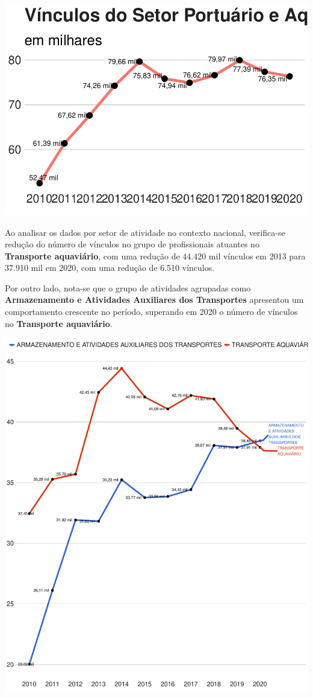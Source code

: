 \documentclass[
]{article}
\begin{document}
\includegraphics{mercado_trabalho_files/figure-latex/g_secao-1.pdf}

Ao analisar os dados por setor de atividade no contexto nacional,
verifica-se redução do número de vínculos no grupo de profissionais
atuantes no \textbf{Transporte aquaviário}, com uma redução de 44.420
mil vínculos em 2013 para 37.910 mil em 2020, com uma redução de 6.510
vínculos.

Por outro lado, nota-se que o grupo de atividades agrupadas como
\textbf{Armazenamento e Atividades Auxiliares dos Transportes}
apresentou um comportamento crescente no período, superando em 2020 o
número de vínculos no \textbf{Transporte aquaviário}.

\includegraphics{mercado_trabalho_files/figure-latex/g_divisao-1.pdf}
\end{document}
